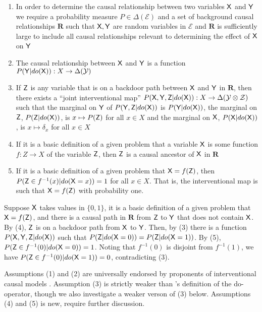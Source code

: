 \begin{enumerate}
 \item In order to determine the causal relationship between two variables $\mathsf{X}$ and $\mathsf{Y}$ we require a probability measure $P\in \Delta(\mathcal{E})$ and a set of background causal relationships $\mathbf{R}$ such that $\mathsf{X},\mathsf{Y}$ are random variables in $\mathcal{E}$ and $\mathbf{R}$ is sufficiently large to include all causal relationships relevant to determining the effect of $\mathsf{X}$ on $\mathsf{Y}$
 \item The causal relationship between $\mathsf{X}$ and $\mathsf{Y}$ is a function $P(\mathsf{Y}|do(\mathsf{X})):X\to \Delta(\mathcal{Y})$
 \item If $\mathsf{Z}$ is any variable that is on a backdoor path between $\mathsf{X}$ and $\mathsf{Y}$ in $\mathbf{R}$, then there exists a ``joint interventional map'' $P(\mathsf{X},\mathsf{Y},\mathsf{Z}|do(\mathsf{X})):X\to \Delta(\mathcal{Y}\otimes\mathcal{Z})$ such that the marginal on $\mathsf{Y}$ of $P(\mathsf{Y},\mathsf{Z}|do(\mathsf{X}))$ is $P(\mathsf{Y}|do(\mathsf{X}))$, the marginal on $\mathsf{Z}$, $P(\mathsf{Z}|do(\mathsf{X}))$, is $x\mapsto P(\mathsf{Z})$ for all $x\in X$ and the marginal on $\mathsf{X}$, $P(\mathsf{X}|do(\mathsf{X}))$, is $x\mapsto \delta_x$ for all $x\in X$
 \item If it is a basic definition of a given problem that a variable $\mathsf{X}$ is some function $f:Z \to X$ of the variable $\mathsf{Z}$, then $\mathsf{Z}$ is a causal ancestor of $\mathsf{X}$ in $\mathbf{R}$
 \item If it is a basic definition of a given problem that $\mathsf{X}=f(\mathsf{Z})$, then $P(\mathsf{Z}\in f^{-1}(x)|do(\mathsf{X}=x))=1$ for all $x\in X$. That is, the interventional map is such that $\mathsf{X}=f(\mathsf{Z})$ with probability one.
\end{enumerate}


Suppose $\mathsf{X}$ takes values in $\{0,1\}$, it is a basic definition of a given problem that $\mathsf{X}=f(\mathsf{Z})$, and there is a causal path in $\mathbf{R}$ from $\mathsf{Z}$ to $\mathsf{Y}$ that does not contain $\mathsf{X}$. By (4), $\mathsf{Z}$ is on a backdoor path from $\mathsf{X}$ to $\mathsf{Y}$. Then, by (3) there is a function $P(\mathsf{X},\mathsf{Y},\mathsf{Z}|do(\mathsf{X}))$ such that $P(\mathsf{Z}|do(\mathsf{X}=0))=P(\mathsf{Z}|do(\mathsf{X}=1))$. By (5), $P(\mathsf{Z}\in f^{-1}(0)|do(\mathsf{X}=0))=1$. Noting that $f^{-1}(0)$ is disjoint from $f^{-1}(1)$, we have $P(\mathsf{Z}\in f^{-1}(0)|do(\mathsf{X}=1))=0$, contradicting (3).

Assumptions (1) and (2) are universally endorsed by proponents of interventional causal models \citep{spirtes_causation_1993,pearl_causality:_2009,woodward_causation_2016}. Assumption (3) is strictly weaker than \citet{pearl_causality:_2009}'s definition of the do-operator, though we also investigate a weaker verson of (3) below. Assumptions (4) and (5) is new, require further discussion.

